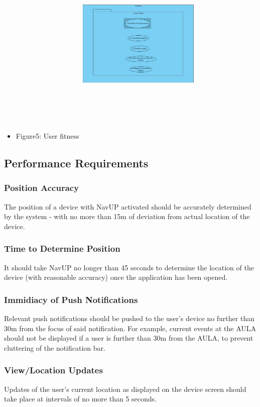 \documentclass[12pt, a4paper]{article}
\begin{document}
\begin{itemize}
				\item Figure5: User fitness
					\includegraphics[width = 6cm, height = 10cm]{User_fitness.JPG}
			\end{itemize}
		
	\subsection{Performance Requirements}
		\subsubsection{Position Accuracy} The position of a device with NavUP activated should be accurately determined by the system - with no more than 15m of deviation from actual location of the device.
		\subsubsection{Time to Determine Position} It should take NavUP no longer than 45 seconds to determine the location of the device (with reasonable accuracy) once the application has been opened.
		\subsubsection{Immidiacy of Push Notifications} Relevant push notifications should be pushed to the user's device no further than 30m from the focus of said notification. For example, current events at the AULA should not be displayed if a user is further than 30m from the AULA, to prevent cluttering of the notification bar.
		\subsubsection{View/Location Updates} Updates of the user's current location as displayed on the device screen should take place at intervals of no more than 5 seconds.
\end{document}
